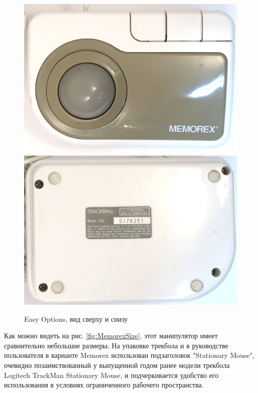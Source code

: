 \documentclass[11pt, a4paper]{article}
\begin{document}
\begin{figure}[h]
    \centering
    \includegraphics[scale=0.45]{1994_memorex_trackball/top_30.jpg}
    \includegraphics[scale=0.45]{1994_memorex_trackball/bottom_30.jpg}
    \caption{Easy Options, вид сверху и снизу}
    \label{fig:MemorexTopBottom}
\end{figure}

Как можно видеть на рис. \ref{fig:MemorexSize}, этот манипулятор имеет сравнительно небольшие размеры.
На упаковке трекбола и в руководстве пользователя в варианте Memorex использован подзаголовок "Stationary Mouse", очевидно позаимствованный у выпущенной годом ранее модели трекбола Logitech TrackMan Stationary Mouse, и подчеркивается удобство его использования в условиях ограниченного рабочего пространства.
\end{document}
